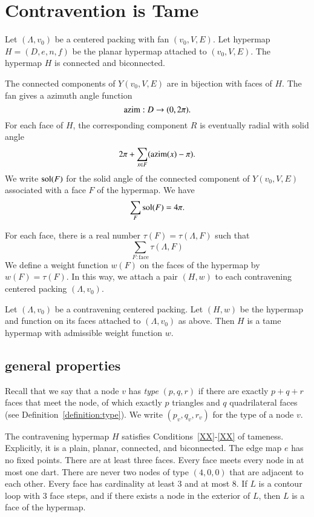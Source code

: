 \section{Contravention is Tame}
    \label{sec:contraproof}

Let $(\Lambda,v_0)$ be a centered packing with
fan $(v_0,V,E)$.  Let  hypermap $H=(D,e,n,f)$
be the planar hypermap attached to $(v_0,V,E)$.
The hypermap $H$ is connected and biconnected.

The connected components of $Y(v_0,V,E)$ are in bijection with
faces of $H$.  
The fan gives a azimuth angle function
$$
{\operatorname{azim}} : D \to (0,2\pi).
$$
For each face of $H$, the corresponding component $R$
is eventually radial with solid
angle
  $$
  2\pi + \sum_{x\in F} ({\operatorname{azim}}(x) -\pi).
  $$
We write $\operatorname{sol}(F)$ for the solid angle of the connected component
of $Y(v_0,V,E)$ associated with a face $F$ of the hypermap.
We have
    $$\sum_{F} \operatorname{sol}(F) = 4\pi.$$


For each face, there is a
real number $\tau(F)=\tau(\Lambda,F)$ such that
$$
  \sum_{F : \text{face}}\tau(\Lambda,F)
$$
We define a weight function $w(F)$ on the faces of the hypermap
by $w(F) = \tau(F)$.  In this way, we attach
a pair $(H,w)$ to each contravening centered packing $(\Lambda,v_0)$.


\begin{theorem} \label{theorem:contravene}
Let $(\Lambda,v_0)$ be a contravening centered packing.  Let $(H,w)$ be
the hypermap and function on its faces attached to $(\Lambda,v_0)$ as above.
Then $H$ is a tame hypermap with admissible weight function $w$.
\end{theorem}




\subsection{general properties}
    \label{sec:startame}


Recall that we say that a node $v$ has {\it type\/} $(p,q,r)$ if
there are exactly $p+q+r$ faces that meet the node, of which exactly
$p$ triangles and $q$ quadrilateral faces (see
Definition~\ref{definition:type}).  We write $(p_v,q_v,r_v)$ for the
type of a node $v$.

\begin{lemma} The contravening hypermap $H$ satisfies Conditions~\ref{XX}-\ref{XX} 
of tameness.
Explicitly, it is a plain, planar, connected, and biconnected. 
The edge map $e$
has no fixed points. There are at least three faces. Every face meets
every node in at most one dart.  There are never two nodes of type
$(4,0,0)$ that are adjacent to each other.  Every face has
cardinality at least $3$ and at most $8$.  If $L$ is a contour loop
with $3$ face steps, and if there exists a node in the exterior of
$L$, then $L$ is a face of the hypermap.
\end{lemma}

